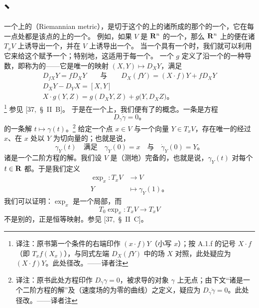 
\section{\trRiemann\trMetric、\trExponentialMap}
\label{sec:riemannian-metrics-exp}

一个\trManifold{}上的\textbf{\trRiemann\trMetric}（Riemannian metric），是切于这个\trManifold{}的\trTangentSpace{}上的诸\trBilinearForm{}所成的那个\trVectorBundle{}的一个\trSection，它在每一点处都是该点的\trTangentSpace{}上的一个\trInnerProduct。
例如，如果 $V$ 是 $\mathbf{R}^{n}$ 的一个\trSubmanifold，那么 $\mathbf{R}^{n}$ 上的\trEuclidean{}\trMetric{}便在诸\trVectorSpace{} $T_{x}V$ 上诱导出一个\trInnerProduct，并在 $V$ 上诱导出一个\trRiemann\trMetric。
当一个\trManifold{}具有一个\trPartitionOfUnity{}时，我们就可以利用它来给这个\trManifold{}赋予一个\trRiemann\trMetric；特别地，这适用于每一个\trCompact\trManifold。
一个\trRiemann\trMetric{} $g$ 定义了\trVectorField{}沿一个\trVectorField{}的一种导数，即称为\trLeviCivita{}\trConnection{}的\trCovariantDerivative——它是唯一的映射 $(X,Y)\mapsto D_{X}Y$，满足
\[
\begin{gathered}
D_{fX}Y=fD_{X}Y\qquad\text{与}\qquad D_{X}(fY)=(X\cdot f)Y+fD_{X}Y\\
D_{X}Y-D_{Y}X=[X,Y]\\
X\cdot g(Y,Z)=g(D_{X}Y,Z)+g\bigl(Y,D_{X}Z\bigr)\text{。}
\end{gathered}
\]
\footnote{译注：原书第一个条件的右端印作 $(x\cdot f)Y$（小写 $x$）；按 A.1.f 的记号 $X\cdot f$（即 $T_{x}f(X_{x})$），与同式左端 $D_{X}(fY)$ 中的场 $X$ 对照，此处疑应为 $(X\cdot f)Y$。此处径改。——译者注}
参见 [37,~§~II~B]。
于是在一个\trRiemann\trManifold{}上，我们便有了\trGeodesic{}的概念。一条\trGeodesic{}是\trDifferential{}方程
\[
D_{\dot{\gamma}}\dot{\gamma}=0\text{。}
\]
的一条解 $t\mapsto\gamma(t)$。\footnote{译注：原书此处方程印作 $D_{\dot{\gamma}}\gamma=0$，被求导的对象 $\gamma$ 上无点；由下文“诸\trGeodesic{}是一个二阶\trDifferential{}方程的解”及\trGeodesic（速度场的\trCovariantDerivative{}为零的曲线）之定义，疑应为 $D_{\dot{\gamma}}\dot{\gamma}=0$。此处径改。——译者注}
给定一个点 $x\in V$ 与一个向量 $Y\in T_{x}V$，存在唯一的经过 $x$、在 $x$ 处以 $Y$ 为切向量的\trGeodesic；也就是说，
\[
\gamma_{Y}(t)\quad\text{满足}\quad\gamma_{Y}(0)=x\quad\text{与}\quad\dot{\gamma}_{Y}(0)=Y\text{。}
\]
诸\trGeodesic{}是一个二阶\trDifferential{}方程的解。我们设 $V$ 是（测地）完备的，也就是说，$\gamma_{Y}(t)$ 对每个 $t\in\mathbf{R}$ 都\trWellDefined。于是我们定义
\[
\begin{aligned}
\exp_{x}:T_{x}V&\longrightarrow V\\
Y&\longmapsto\gamma_{Y}(1)\text{。}
\end{aligned}
\]
我们可以证明：$\exp_{x}$ 是一个局部\trDiffeomorphism，而
\[
T_{0}\exp_{x}:T_{x}V\longrightarrow T_{x}V
\]
不是别的，正是恒等映射。参见 [37,~§~II~C]。

